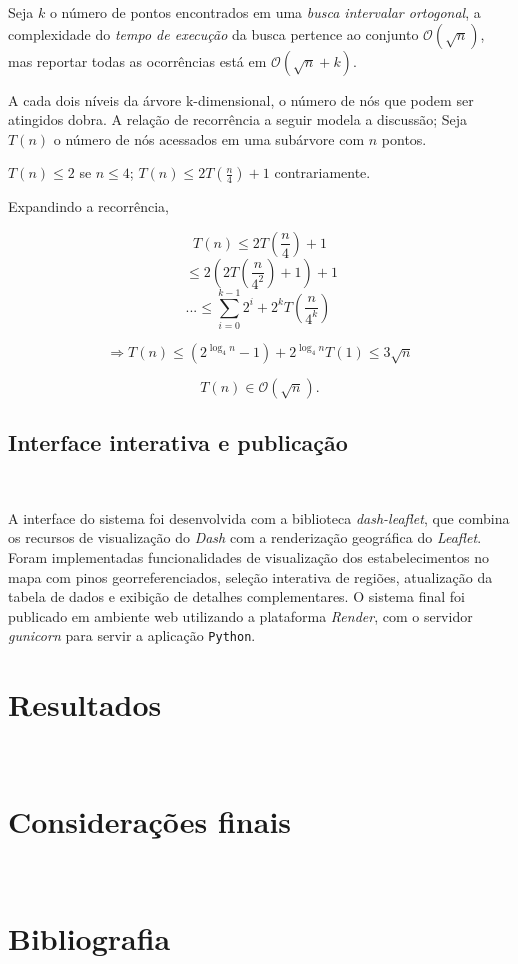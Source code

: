 \documentclass{article}
\begin{document}
\begin{adjustwidth}{-1.5cm}{-1.5cm}
Seja \(k\) o número de pontos encontrados em uma \textit{busca intervalar ortogonal}, a complexidade do \textit{tempo de execução} da busca pertence ao conjunto \(\mathcal{O}(\sqrt{n})\), mas reportar todas as ocorrências está em \(\mathcal{O}(\sqrt{n} + k)\).

A cada dois níveis da árvore k-dimensional, o número de nós que podem ser atingidos dobra. A relação de recorrência a seguir modela a discussão; Seja \(T(n)\) o número de nós acessados em uma subárvore com \(n\) pontos.

\(T(n) \leq 2\) se \(n \le 4\); \(T(n) \leq 2T(\frac{n}{4}) + 1\) contrariamente.

Expandindo a recorrência,

\[T(n) \leq 2T(\frac{n}{4}) + 1\]
\[ \ \leq 2(2T(\frac{n}{4^2})+ 1) + 1 \]
\[... \leq \sum_{i=0}^{k-1}2^i + 2^k T(\frac{n}{4^k}) \ \]

\[\Rightarrow T(n) \leq (2^{\log_4 n} -1 ) + 2^{\log_4 n}T(1) \leq 3 \sqrt{n}\]

\[T(n) \in \mathcal{O} (\sqrt{n}).\]


\subsection{Interface interativa e publicação}
\ 

A interface do sistema foi desenvolvida com a biblioteca \textit{dash-leaflet}, que combina os recursos de visualização do \textit{Dash} com a renderização geográfica do \textit{Leaflet}. Foram implementadas funcionalidades de visualização dos estabelecimentos no mapa com pinos georreferenciados, seleção interativa de regiões, atualização da tabela de dados e exibição de detalhes complementares. O sistema final foi publicado em ambiente web utilizando a plataforma \textit{Render}, com o servidor \textit{gunicorn} para servir a aplicação \texttt{Python}.


\section{Resultados}
\ 


\section{Considerações finais}
\ 



\newpage
\section{Bibliografia}


\end{adjustwidth}
\end{document}
